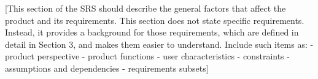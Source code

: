 [This section of the SRS should describe the 
general factors that affect the product and its 
requirements.  This section does not state 
specific requirements.  Instead, it provides a 
background for those requirements, which are 
defined in detail in Section 3, and makes them 
easier to understand. Include such items as:
- product perspective
- product functions
- user characteristics
- constraints
- assumptions and dependencies
- requirements subsets]